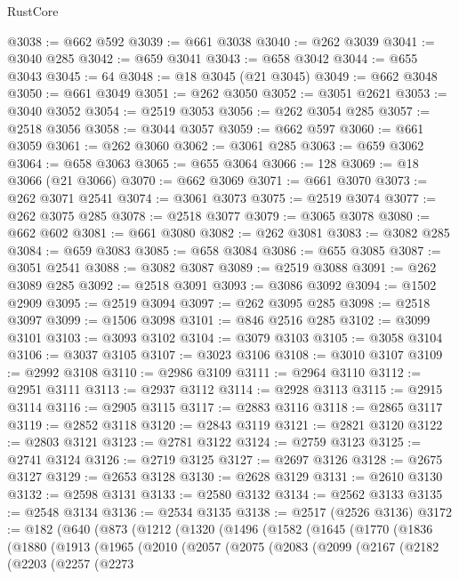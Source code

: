 \begin{lexlean}{RustCore}
\begin{coremodule}
@3038 := @662 @592
@3039 := @661 @3038
@3040 := @262 @3039
@3041 := @3040 @285
@3042 := @659 @3041
@3043 := @658 @3042
@3044 := @655 @3043
@3045 := 64
@3048 := @18 @3045 (@21 @3045)
@3049 := @662 @3048
@3050 := @661 @3049
@3051 := @262 @3050
@3052 := @3051 @2621
@3053 := @3040 @3052
@3054 := @2519 @3053
@3056 := @262 @3054 @285
@3057 := @2518 @3056
@3058 := @3044 @3057
@3059 := @662 @597
@3060 := @661 @3059
@3061 := @262 @3060
@3062 := @3061 @285
@3063 := @659 @3062
@3064 := @658 @3063
@3065 := @655 @3064
@3066 := 128
@3069 := @18 @3066 (@21 @3066)
@3070 := @662 @3069
@3071 := @661 @3070
@3073 := @262 @3071 @2541
@3074 := @3061 @3073
@3075 := @2519 @3074
@3077 := @262 @3075 @285
@3078 := @2518 @3077
@3079 := @3065 @3078
@3080 := @662 @602
@3081 := @661 @3080
@3082 := @262 @3081
@3083 := @3082 @285
@3084 := @659 @3083
@3085 := @658 @3084
@3086 := @655 @3085
@3087 := @3051 @2541
@3088 := @3082 @3087
@3089 := @2519 @3088
@3091 := @262 @3089 @285
@3092 := @2518 @3091
@3093 := @3086 @3092
@3094 := @1502 @2909
@3095 := @2519 @3094
@3097 := @262 @3095 @285
@3098 := @2518 @3097
@3099 := @1506 @3098
@3101 := @846 @2516 @285
@3102 := @3099 @3101
@3103 := @3093 @3102
@3104 := @3079 @3103
@3105 := @3058 @3104
@3106 := @3037 @3105
@3107 := @3023 @3106
@3108 := @3010 @3107
@3109 := @2992 @3108
@3110 := @2986 @3109
@3111 := @2964 @3110
@3112 := @2951 @3111
@3113 := @2937 @3112
@3114 := @2928 @3113
@3115 := @2915 @3114
@3116 := @2905 @3115
@3117 := @2883 @3116
@3118 := @2865 @3117
@3119 := @2852 @3118
@3120 := @2843 @3119
@3121 := @2821 @3120
@3122 := @2803 @3121
@3123 := @2781 @3122
@3124 := @2759 @3123
@3125 := @2741 @3124
@3126 := @2719 @3125
@3127 := @2697 @3126
@3128 := @2675 @3127
@3129 := @2653 @3128
@3130 := @2628 @3129
@3131 := @2610 @3130
@3132 := @2598 @3131
@3133 := @2580 @3132
@3134 := @2562 @3133
@3135 := @2548 @3134
@3136 := @2534 @3135
@3138 := @2517 (@2526 @3136)
@3172 := @182
    (@640
      (@873
        (@1212
          (@1320
            (@1496
              (@1582
                (@1645
                  (@1770
                    (@1836
                      (@1880
                        (@1913
                          (@1965
                            (@2010
                              (@2057
                                (@2075
                                  (@2083
                                    (@2099
                                      (@2167
                                        (@2182
                                          (@2203
                                            (@2257
                                              (@2273

\end{coremodule}
\end{lexlean}
